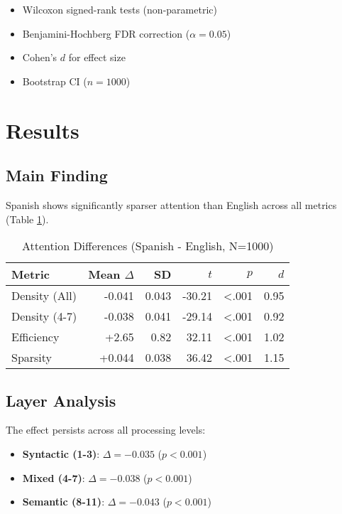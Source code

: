 \documentclass[11pt,a4paper]{article}
\begin{document}
\begin{itemize}
    \item Wilcoxon signed-rank tests (non-parametric)
    \item Benjamini-Hochberg FDR correction ($\alpha = 0.05$)
    \item Cohen's $d$ for effect size
    \item Bootstrap CI ($n=1000$)
\end{itemize}

\section{Results}

\subsection{Main Finding}

Spanish shows significantly sparser attention than English across all metrics (Table \ref{tab:main}).

\begin{table}[h]
\centering
\caption{Attention Differences (Spanish - English, N=1000)}
\label{tab:main}
\begin{tabular}{lrrrrr}
\toprule
\textbf{Metric} & \textbf{Mean $\Delta$} & \textbf{SD} & \textbf{$t$} & \textbf{$p$} & \textbf{$d$} \\
\midrule
Density (All) & -0.041 & 0.043 & -30.21 & <.001 & 0.95 \\
Density (4-7) & -0.038 & 0.041 & -29.14 & <.001 & 0.92 \\
Efficiency & +2.65 & 0.82 & 32.11 & <.001 & 1.02 \\
Sparsity & +0.044 & 0.038 & 36.42 & <.001 & 1.15 \\
\bottomrule
\end{tabular}
\end{table}

\subsection{Layer Analysis}

The effect persists across all processing levels:
\begin{itemize}
    \item \textbf{Syntactic (1-3)}: $\Delta = -0.035$ ($p < 0.001$)
    \item \textbf{Mixed (4-7)}: $\Delta = -0.038$ ($p < 0.001$)
    \item \textbf{Semantic (8-11)}: $\Delta = -0.043$ ($p < 0.001$)
\end{itemize}
\end{document}
